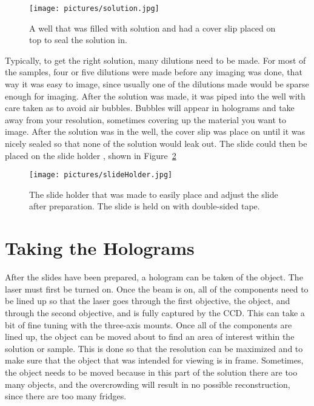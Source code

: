 \begin{figure}[htbp!]
\begin{center}
    \texttt{[image: pictures/solution.jpg]}
\end{center}
\caption{A well that was filled with solution and had a cover slip placed on
top to seal the solution in.}
\label{fig:solutionSlide}
\end{figure}

Typically, to get the right solution, many dilutions need to be made. For most
of the samples, four or five dilutions were made before any imaging was done,
that way it was easy to image, since usually one of the dilutions made would be
sparse enough for imaging.
After the solution was made, it was piped into the well with care taken as to
avoid air bubbles. Bubbles will appear in holograms and take away from your
resolution, sometimes covering up the material you want to image. After the
solution was in the well, the cover slip was place on until it was nicely
sealed so that none of the solution would leak out. The slide could then be
placed on the slide holder%
, shown in Figure~\ref{fig:slideHolder}

\begin{figure}[htbp!]
\begin{center}
    \texttt{[image: pictures/slideHolder.jpg]}
\end{center}
\caption{The slide holder that was made to easily place and adjust the slide
after preparation. The slide is held on with double-sided tape.}
\label{fig:slideHolder}
\end{figure}


\section{Taking the Holograms}

After the slides have been prepared, a hologram can be taken of the object. The
laser must first be turned on. Once the beam is on, all of the components need
to be lined up so that the laser goes through the first objective, the object,
and through the second objective, and is fully captured by the CCD\@. This can
take a bit of fine tuning with the three-axis mounts. Once all of the
components are lined up, the object can be moved about to find an area of
interest within the solution or sample. This is done so that the resolution can
be maximized and to make sure that the object that was intended for viewing is
in frame. Sometimes, the object needs to be moved because in this part of the
solution there are too many objects, and the overcrowding will result in no
possible reconstruction, since there are too many fridges. 

